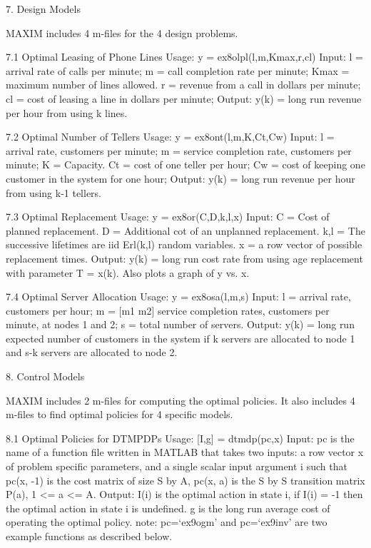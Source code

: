 7. Design Models


MAXIM includes 4 m-files for the 4 design problems. 


7.1 Optimal Leasing of Phone Lines
Usage:  y = ex8olpl(l,m,Kmax,r,cl)
Input: l =  arrival rate of calls per minute;
m =  call completion rate per minute;
Kmax = maximum number of lines allowed.
r =  revenue from a call in dollars per minute;
cl =  cost of leasing a line in dollars per minute;
Output: y(k) = long run revenue per hour from using k lines.

7.2 Optimal Number of Tellers
Usage:  y = ex8ont(l,m,K,Ct,Cw)
Input: l =  arrival rate, customers per minute;
m =  service completion rate, customers per minute;
K = Capacity.
Ct =  cost of one teller per hour;
Cw =  cost of keeping one customer in the system for one hour;
Output: y(k) = long run revenue per hour from using k-1 tellers.

7.3 Optimal Replacement
Usage:  y = ex8or(C,D,k,l,x)
Input: C = Cost of planned replacement.
D = Additional cot of an unplanned replacement.
k,l =  The successive lifetimes are iid   Erl(k,l) random variables.
x = a row vector of possible replacement times.
Output: y(k) = long run cost rate  from using age replacement with parameter T = x(k). Also plots a graph of y vs. x.

7.4 Optimal Server Allocation
Usage:  y = ex8osa(l,m,s)
Input: l =  arrival rate, customers per hour;
m = [m1 m2]  service completion rates, customers per minute, at nodes 1 and 2;
s = total number of servers.
Output: y(k) = long run expected number of customers in the system if k servers are allocated to node 1 and s-k servers are allocated to node 2.



8. Control Models


MAXIM includes 2 m-files for computing the optimal policies. It also includes 4 m-files to find optimal policies for 4 specific models.

8.1 Optimal Policies for DTMPDPs 
Usage:  [I,g] = dtmdp(pc,x)
Input: pc is the name of a  function file written in MATLAB that takes two inputs: a row vector x of problem specific parameters, and  a single scalar input 
argument i such that 
pc(x, -1) is the cost matrix of size S by A, 
pc(x, a) is the S by S transition matrix P(a), 1 <= a <= A.
Output: I(i) is the optimal action in state i, if I(i) = -1 then the 
optimal action in state i is undefined. g is the long run average cost of 
operating the optimal policy.
note: pc=`ex9ogm' and  pc=`ex9inv' are two example functions as described below.
 
